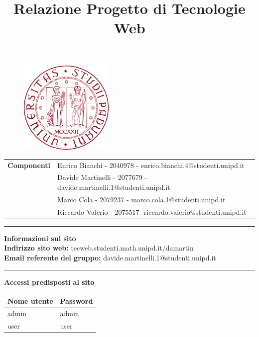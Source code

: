 \documentclass{article}
\title{\textbf{Relazione Progetto di Tecnologie Web}}
\date{}
\makeatletter
\newcommand{\componenti}{
    & Enrico Bianchi - 2040978 - enrico.bianchi.4@studenti.unipd.it\\
    & Davide Martinelli - 2077679 - davide.martinelli.1@studenti.unipd.it \\
    & Marco Cola - 2079237 - marco.cola.1@studenti.unipd.it\\
    & Riccardo Valerio - 2075517 -riccardo.valerio@studenti.unipd.it\\
}
\makeatother
\begin{document}
\maketitle

\begin{figure}[H]
    \centering
    \includegraphics[width=0.4\textwidth]{img/logo_unipd.png}
    \label{fig:logo_unipd}
\end{figure}

\vspace{0.5cm}

\begin{center}
\begin{tabular}{r|l}
    \textbf{Componenti} \componenti 
\end{tabular}

\vspace{1cm}
\rule{\linewidth}{0.2mm}

\vspace{0.3cm}

\textbf{Informazioni sul sito} \\
\textbf{Indirizzo sito web:} tecweb.studenti.math.unipd.it/damartin \\
\textbf{Email referente del gruppo: }davide.martinelli.1@studenti.unipd.it

\vspace{0.3cm}
\rule{\linewidth}{0.2mm}

\vspace{0.5cm}
\textbf{Accessi predisposti al sito}
\begin{table}[h]
    \centering
    \begin{tabular}{|p{5cm}|p{5cm}|}
        \hline
        \rowcolor{gray!30}
        Nome utente & Password \\
        \hline
        admin & admin   \\
        \hline
        user & user   \\
        \hline
    \end{tabular}
\end{table}

\end{center}
\end{document}
